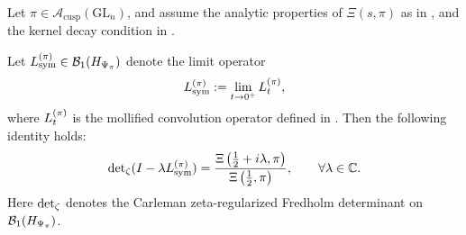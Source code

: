 \begin{theorem}
\label{thm:spectral_determinant_identity_Lpi}
Let \( \pi \in \mathcal{A}_{\mathrm{cusp}}(\mathrm{GL}_n) \), and assume the analytic properties of \( \Xi(s, \pi) \) as in , and the kernel decay condition in .

Let \( L_{\mathrm{sym}}^{(\pi)} \in \mathcal{B}_1(H_{\Psi_{\pi}}) \) denote the limit operator
\[
L_{\mathrm{sym}}^{(\pi)} := \lim_{t \to 0^+} L_t^{(\pi)},
\]
where \( L_t^{(\pi)} \) is the mollified convolution operator defined in . Then the following identity holds:
\[
\det\nolimits_{\zeta}(I - \lambda L_{\mathrm{sym}}^{(\pi)}) = \frac{\Xi\left(\tfrac{1}{2} + i\lambda, \pi\right)}{\Xi\left(\tfrac{1}{2}, \pi\right)},
\qquad \forall \lambda \in \mathbb{C}.
\]
Here \( \det\nolimits_{\zeta} \) denotes the Carleman zeta-regularized Fredholm determinant on \( \mathcal{B}_1(H_{\Psi_{\pi}}) \).

\end{theorem}
